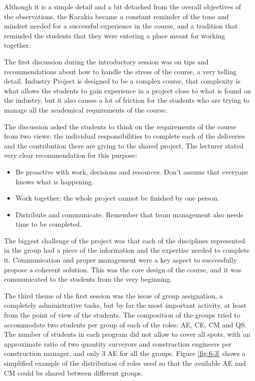 Although it is a simple detail and a bit detached from the overall objectives of the observations, the Karakia became a constant reminder of the tone and mindset needed for
a successful experience in the course, and a tradition that reminded the students that they were entering a place meant for working together.

The first discussion during the introductory session was on tips and recommendations about how to handle the stress of the course, a very telling detail. Industry Project
is designed to be a complex course, that complexity is what allows the students to gain experience in a project close to what is found on the industry, but it also causes
a lot of friction for the students who are trying to manage all the academical requirements of the course.

The discussion asked the students to think on the requirements of the course from two views: the individual responsibilities to complete each of the deliveries and the
contribution there are giving to the shared project. The lecturer stated very clear recommendation for this purpose:

\begin{itemize}
    \item Be proactive with work, decisions and resources. Don't assume that everyone knows what is happening.
    \item Work together; the whole project cannot be finished by one person.
    \item Distribute and communicate. Remember that team management also needs time to be completed.
\end{itemize}

The biggest challenge of the project was that each of the disciplines represented in the group had a piece of the information and the expertise needed to complete it.
Communication and proper management were a key aspect to successfully propose a coherent solution. This was the core design of the course, and it was communicated to the
students from the very beginning.

The third theme of the first session was the issue of group assignation, a completely administrative tasks, but by far the most important activity, at least from the point
of view of the students. The composition of the groups tried to accommodate two students per group of each of the roles: \ac{AE}, \ac{CE}, \ac{CM} and \ac{QS}. The number
of students in each program did not allow to cover all spots, with an approximate ratio of two quantity surveyors and construction engineers per construction manager, and
only 3 \ac{AE} for all the groups. Figure \ref{fig:6-3} shows a simplified example of the distribution of roles used so that the available \ac{AE} and \ac{CM}
could be shared between different groups.

